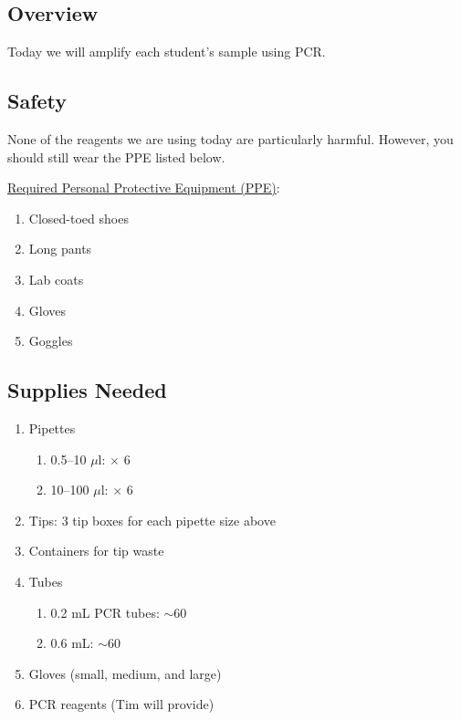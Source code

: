 \documentclass[12pt, hidelinks]{article}
\begin{document}
	\subsection{Overview}
	Today we will amplify each student's sample using PCR.
	
	
	\subsection{Safety}
	None of the reagents we are using today are particularly harmful. However, you should still wear the PPE listed below.
	
	\underline{Required Personal Protective Equipment (PPE)}:
		\begin{enumerate}
			\item Closed-toed shoes
			\item Long pants
			\item Lab coats
			\item Gloves
			\item Goggles
		\end{enumerate}	
	
	
	\subsection{Supplies Needed}
		\begin{enumerate}
			\item Pipettes
				\begin{enumerate}
					\item 0.5--10 $\mu$l: $\times$ 6
					\item 10--100 $\mu$l: $\times$ 6
				\end{enumerate}
			\item Tips: 3 tip boxes for each pipette size above	
			\item Containers for tip waste
			\item Tubes
				\begin{enumerate}
					\item 0.2 mL PCR tubes: $\sim$60
					\item 0.6 mL: $\sim$60
				\end{enumerate}	
			\item Gloves (small, medium, and large)
			\item PCR reagents (Tim will provide)
	\end{enumerate}	
	
\end{document}
